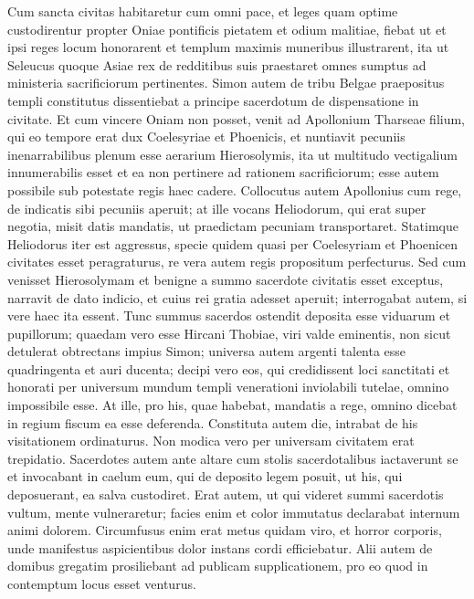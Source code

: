\begin{biblechapter}  
\verse Cum sancta civitas habitaretur cum omni pace, et leges quam optime custodirentur propter Oniae pontificis pietatem et odium malitiae, 
\verse fiebat ut et ipsi reges locum honorarent et templum maximis muneribus illustrarent,  
\verse ita ut Seleucus quoque Asiae rex de redditibus suis praestaret omnes sumptus ad ministeria sacrificiorum pertinentes. 
\verse Simon autem de tribu Belgae praepositus templi constitutus dissentiebat a principe sacerdotum de dispensatione in civitate. 
\verse Et cum vincere Oniam non posset, venit ad Apollonium Tharseae filium, qui eo tempore erat dux Coelesyriae et Phoenicis,  
\verse et nuntiavit pecuniis inenarrabilibus plenum esse aerarium Hierosolymis, ita ut multitudo vectigalium innumerabilis esset et ea non pertinere ad rationem sacrificiorum; esse autem possibile sub potestate regis haec cadere. 
\verse Collocutus autem Apollonius cum rege, de indicatis sibi pecuniis aperuit; at ille vocans Heliodorum, qui erat super negotia, misit datis mandatis, ut praedictam pecuniam transportaret. 
\verse Statimque Heliodorus iter est aggressus, specie quidem quasi per Coelesyriam et Phoenicen civitates esset peragraturus, re vera autem regis propositum perfecturus. 
\verse Sed cum venisset Hierosolymam et benigne a summo sacerdote civitatis esset exceptus, narravit de dato indicio, et cuius rei gratia adesset aperuit; interrogabat autem, si vere haec ita essent. 
\verse Tunc summus sacerdos ostendit deposita esse viduarum et pupillorum;  
\verse quaedam vero esse Hircani Thobiae, viri valde eminentis, non sicut detulerat obtrectans impius Simon; universa autem argenti talenta esse quadringenta et auri ducenta; 
\verse decipi vero eos, qui credidissent loci sanctitati et honorati per universum mundum templi venerationi inviolabili tutelae, omnino impossibile esse. 
\verse At ille, pro his, quae habebat, mandatis a rege, omnino dicebat in regium fiscum ea esse deferenda. 
\verse Constituta autem die, intrabat de his visitationem ordinaturus. Non modica vero per universam civitatem erat trepidatio. 
\verse Sacerdotes autem ante altare cum stolis sacerdotalibus iactaverunt se et invocabant in caelum eum, qui de deposito legem posuit, ut his, qui deposuerant, ea salva custodiret. 
\verse Erat autem, ut qui videret summi sacerdotis vultum, mente vulneraretur; facies enim et color immutatus declarabat internum animi dolorem. 
\verse Circumfusus enim erat metus quidam viro, et horror corporis, unde manifestus aspicientibus dolor instans cordi efficiebatur. 
\verse Alii autem de domibus gregatim prosiliebant ad publicam supplicationem, pro eo quod in contemptum locus esset venturus. 

\end{biblechapter}
